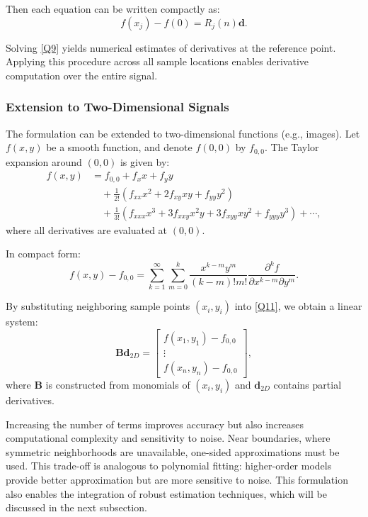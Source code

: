 \documentclass{elsarticle}
\begin{document}
Then each equation can be written compactly as:
\begin{equation}\label{Q8}
	f(x_j) - f(0) = R_j(n)\mathbf{d}.
\end{equation}

Solving \eqref{Q9} yields numerical estimates of derivatives at the reference point. Applying this procedure across all sample locations enables derivative computation over the entire signal.

\subsubsection{Extension to Two-Dimensional Signals}

The formulation can be extended to two-dimensional functions (e.g., images). Let $f(x,y)$ be a smooth function, and denote $f(0,0)$ by $f_{0,0}$. The Taylor expansion around $(0,0)$ is given by:
\begin{equation}\label{Q10}
	\begin{aligned}
		f(x,y) &= f_{0,0} + f_x x + f_y y \\
		&\quad + \frac{1}{2!} \left( f_{xx} x^2 + 2 f_{xy} xy + f_{yy} y^2 \right) \\
		&\quad + \frac{1}{3!} \left( f_{xxx} x^3 + 3 f_{xxy} x^2 y + 3 f_{xyy} x y^2 + f_{yyy} y^3 \right) + \cdots,
	\end{aligned}
\end{equation}
where all derivatives are evaluated at $(0,0)$.

In compact form:
\begin{equation}\label{Q11}
	f(x,y) - f_{0,0} =
	\sum_{k=1}^{\infty} \sum_{m=0}^{k}
	\frac{x^{k-m} y^{m}}{(k-m)!m!}
	\frac{\partial^{k} f}{\partial x^{k-m} \partial y^{m}}.
\end{equation}

By substituting neighboring sample points $(x_i,y_i)$ into \eqref{Q11}, we obtain a linear system:
\begin{equation}\label{Q12}
	\mathbf{B}\mathbf{d}_{2D} =
	\begin{bmatrix}
		f(x_1,y_1)-f_{0,0} \\
		\vdots \\
		f(x_n,y_n)-f_{0,0}
	\end{bmatrix},
\end{equation}
where $\mathbf{B}$ is constructed from monomials of $(x_i,y_i)$ and $\mathbf{d}_{2D}$ contains partial derivatives.

Increasing the number of terms improves accuracy but also increases computational complexity and sensitivity to noise. Near boundaries, where symmetric neighborhoods are unavailable, one-sided approximations must be used. This trade-off is analogous to polynomial fitting: higher-order models provide better approximation but are more sensitive to noise. This formulation also enables the integration of robust estimation techniques, which will be discussed in the next subsection.
\end{document}
